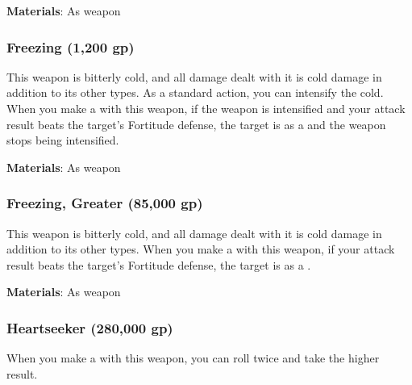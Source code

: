 \vspace{0.25em}
\textbf{Materials}: As weapon


\lowercase{\hypertarget{item:Freezing}{}}\label{item:Freezing}
\hypertarget{item:Freezing}{\subsubsection{Freezing\hfill{} (1,200 gp)}}

This weapon is bitterly cold, and all damage dealt with it is cold damage in addition to its other types.
As a standard action, you can intensify the cold.
When you make a  with this weapon, if the weapon is intensified and your attack result beats the target's Fortitude defense,
the target is \fatigued as a  and the weapon stops being intensified.



\vspace{0.25em}
\textbf{Materials}: As weapon


\lowercase{\hypertarget{item:Freezing, Greater}{}}\label{item:Freezing, Greater}
\hypertarget{item:Freezing, Greater}{\subsubsection{Freezing, Greater\hfill{} (85,000 gp)}}

This weapon is bitterly cold, and all damage dealt with it is cold damage in addition to its other types.
When you make a  with this weapon, if your attack result beats the target's Fortitude defense, the target is \fatigued as a .



\vspace{0.25em}
\textbf{Materials}: As weapon


\lowercase{\hypertarget{item:Heartseeker}{}}\label{item:Heartseeker}
\hypertarget{item:Heartseeker}{\subsubsection{Heartseeker\hfill{} (280,000 gp)}}

When you make a  with this weapon, you can roll twice and take the higher result.



